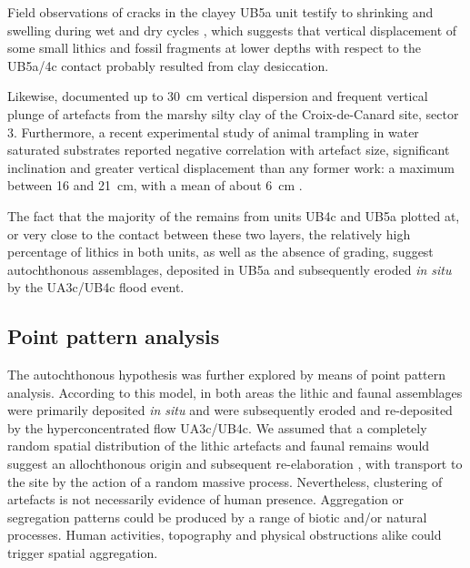 \documentclass[preprint,authoryear,times]{elsarticle} %
\begin{document}
Field observations of cracks in the clayey UB5a unit testify to shrinking and swelling during wet and dry cycles \citep{Karkanas}, which suggests that vertical displacement of some small lithics and fossil fragments at lower depths with respect to the UB5a/4c contact probably resulted from clay desiccation.

Likewise, \cite{Lenoble2004} documented up to 30~cm vertical dispersion and frequent vertical plunge of artefacts from the marshy silty clay of the Croix-de-Canard site, sector 3. Furthermore, a recent experimental study of animal trampling in water saturated substrates reported negative correlation with artefact size, significant inclination and greater vertical displacement than any former work: a maximum between 16 and 21~cm, with a mean of about 6~cm \citep{Eren2010}.

The fact that the majority of the remains from units UB4c and UB5a plotted at, or very close to the contact between these two layers, the relatively high percentage of lithics in both units, as well as the absence of grading, suggest autochthonous assemblages, deposited in UB5a and subsequently eroded \emph{in situ} by the UA3c/UB4c flood event.

\subsection{Point pattern analysis}

The autochthonous hypothesis was further explored by means of point pattern analysis. According to this model, in both areas the lithic and faunal assemblages were primarily deposited \emph{in situ} and were subsequently eroded and re-deposited \citep[\emph{sensu}][]{Fernandez-Lopez1991} by the hyperconcentrated flow UA3c/UB4c. We assumed that a completely random spatial distribution of the lithic artefacts and faunal remains would suggest an allochthonous origin and subsequent re-elaboration \citep[\emph{sensu}][]{Fernandez-Lopez1991}, with transport to the site by the action of a random massive process. Nevertheless, clustering of artefacts is not necessarily evidence of human presence. Aggregation or segregation patterns could be produced by a range of biotic and/or natural processes. Human activities, topography and physical obstructions alike could trigger spatial aggregation.

\end{document}
